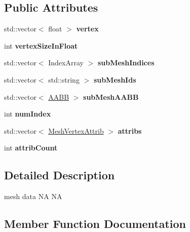 \subsection*{Public Attributes}
\begin{DoxyCompactItemize}
\item 
\mbox{\label{structMeshData_a2c4bfc846bc69d0bd0b788e961c142a9}} 
std\+::vector$<$ float $>$ {\bfseries vertex}
\item 
\mbox{\label{structMeshData_a1ba4ac44572af057db32e7da2b08004a}} 
int {\bfseries vertex\+Size\+In\+Float}
\item 
\mbox{\label{structMeshData_a4c3e6f666d099decfe27a8db1bd6d6df}} 
std\+::vector$<$ Index\+Array $>$ {\bfseries sub\+Mesh\+Indices}
\item 
\mbox{\label{structMeshData_a9b50ec4f643f13875879c0dae66d79a0}} 
std\+::vector$<$ std\+::string $>$ {\bfseries sub\+Mesh\+Ids}
\item 
\mbox{\label{structMeshData_ad0978e8b89cbd016fbfc96668d0e3c81}} 
std\+::vector$<$ \hyperlink{classAABB}{A\+A\+BB} $>$ {\bfseries sub\+Mesh\+A\+A\+BB}
\item 
\mbox{\label{structMeshData_a50472b663d9e753c82736506a7cefb59}} 
int {\bfseries num\+Index}
\item 
\mbox{\label{structMeshData_af2d27d2b4f99398981344e62b08a801c}} 
std\+::vector$<$ \hyperlink{structMeshVertexAttrib}{Mesh\+Vertex\+Attrib} $>$ {\bfseries attribs}
\item 
\mbox{\label{structMeshData_ad2d443522d90b8795f6a3f51bbded853}} 
int {\bfseries attrib\+Count}
\end{DoxyCompactItemize}


\subsection{Detailed Description}
mesh data  NA  NA 

\subsection{Member Function Documentation}
\mbox{\label{structMeshData_ae20d2a9e24fc7f28a873b264bc85236a}} 
